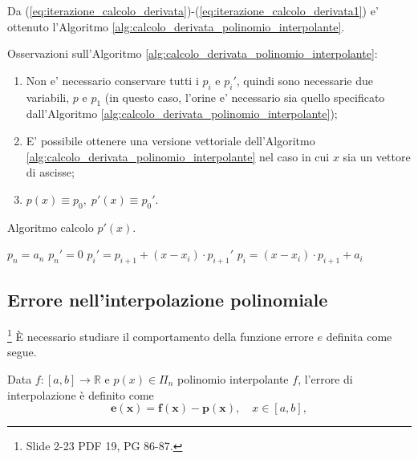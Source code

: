 \noindent Da (\ref{eq:iterazione_calcolo_derivata})-(\ref{eq:iterazione_calcolo_derivata1}) e' ottenuto l'Algoritmo \ref{alg:calcolo_derivata_polinomio_interpolante}.

\begin{remark}
	Osservazioni sull'Algoritmo \ref{alg:calcolo_derivata_polinomio_interpolante}:
	\begin{enumerate}
		\item Non e' necessario conservare tutti i $p_i$ e $p_i'$, quindi sono necessarie due variabili, $p$ e $p_1$ (in questo caso, l'orine e' necessario sia quello specificato dall'Algoritmo \ref{alg:calcolo_derivata_polinomio_interpolante});
		\item E' possibile ottenere una versione vettoriale dell'Algoritmo \ref{alg:calcolo_derivata_polinomio_interpolante} nel caso in cui $x$ sia un vettore di ascisse;
		\item $p(x) \equiv p_0,\; p'(x)\equiv p_0'$.
	\end{enumerate}
\end{remark}

\begin{algorithm}\caption{Algoritmo calcolo $p'(x)$.}\label{alg:calcolo_derivata_polinomio_interpolante}
    \begin{algorithmic}
	        \State $p_n = a_n$
	        \State $p_n'=0$
	            \State $p_i' = p_{i+1} + (x - x_i)\cdot p_{i+1}'$
	            \State $p_i = (x - x_i) \cdot p_{i+1} + a_i$
	        \EndFor
	    \end{algorithmic}
\end{algorithm}

\subsection{Errore nell'interpolazione polinomiale}\label{ssec:errore_interpolazione_polinomiale}\footnote{Slide 2-23 PDF 19, PG 86-87.}
È necessario studiare il comportamento della funzione errore $e$ definita come segue.

\begin{definition}
	Data $f:[a,b]\rightarrow\mathbb{R}$ e $p(x)\in\Pi_n$ polinomio interpolante $f$, l'errore di interpolazione è definito come
	\begin{equation}\label{eq:errore_interpolazione}
	    \boldsymbol{e(x)=f(x)-p(x)},\quad x\in [a,b],
	\end{equation}
\end{definition}

